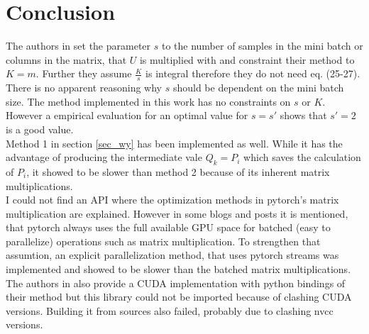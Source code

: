 \documentclass{article}
\begin{document}
\section{Conclusion}
The authors in \cite{fast_hm} set the parameter $s$ to the number of samples in the mini batch or columns in the matrix, that $U$ is multiplied with and constraint their method to $K=m$. Further they assume $\frac{K}{s}$ is integral therefore they do not need eq. (25-27). There is no apparent reasoning why $s$ should be dependent on the mini batch size. The method implemented in this work has no constraints on $s$ or $K$. However a empirical evaluation for an optimal value for $s=s'$ shows that $s'=2$ is a good value.\\
Method 1 in section \ref{sec_wy} has been implemented as well. While it has the advantage of producing the intermediate vale $Q_k=P_i$ which saves the calculation of $P_i$, it showed to be slower than method 2 because of its inherent matrix multiplications.\\
I could not find an API where the optimization methods in pytorch's matrix multiplication are explained. However in some blogs and posts it is mentioned, that pytorch always uses the full available GPU space for batched (easy to parallelize) operations such as matrix multiplication. To strengthen that assumtion, an explicit parallelization method, that uses pytorch streams was implemented and showed to be slower than the batched matrix multiplications.\\
The authors in \cite{fast_hm} also provide a CUDA implementation with python bindings of their method but this library could not be imported because of clashing CUDA versions. Building it from sources also failed, probably due to clashing nvcc versions.

~\label{sec:ref}


\pagebreak
\end{document}
